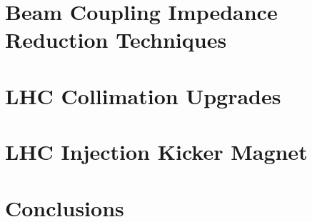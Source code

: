 \documentclass[12pt,PhD]{Thesis}
\begin{document}

\chapter{Beam Coupling Impedance Reduction Techniques}









\chapter{LHC Collimation Upgrades}








\chapter{LHC Injection Kicker Magnet}










\chapter{Conclusions}



\end{document}
